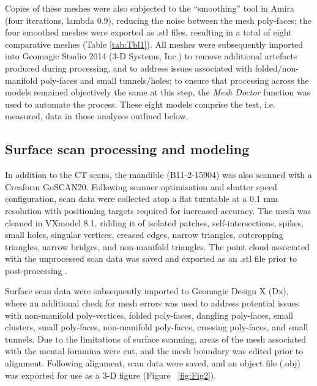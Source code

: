 \documentclass[review]{elsarticle}
\begin{document}
Copies of these meshes were also subjected to the “smoothing” tool in Amira (four iterations, lambda 0.9), reducing the noise between the mesh poly-faces; the four smoothed meshes were exported as .stl files, resulting in a total of eight comparative meshes (Table \ref{tab:Tbl1}). All meshes were subsequently imported into Geomagic Studio 2014 (3-D Systems, Inc.) to remove additional artefacts produced during processing, and to address issues associated with folded/non-manifold poly-faces and small tunnels/holes; to ensure that processing across the models remained objectively the same at this step, the \textit{Mesh Doctor} function was used to automate the process. These eight models comprise the test, i.e. measured, data in those analyses outlined below. 

\subsection{Surface scan processing and modeling}

In addition to the CT scans, the mandible (B11-2-15904) was also scanned with a Creaform GoSCAN20. Following scanner optimisation and shutter speed configuration, scan data were collected atop a flat turntable at a 0.1 mm resolution with positioning targets required for increased accuracy. The mesh was cleaned in VXmodel 8.1, ridding it of isolated patches, self-intersections, spikes, small holes, singular vertices, creased edges, narrow triangles, outcropping triangles, narrow bridges, and non-manifold triangles. The point cloud associated with the unprocessed scan data was saved and exported as an .stl file prior to post-processing \citep{RN5585}. 

Surface scan data \citep{RN5931,RN5924} were subsequently imported to Geomagic Design X (Dx), where an additional check for mesh errors was used to address potential issues with non-manifold poly-vertices, folded poly-faces, dangling poly-faces, small clusters, small poly-faces, non-manifold poly-faces, crossing poly-faces, and small tunnels. Due to the limitations of surface scanning, areas of the mesh associated with the mental foramina were cut, and the mesh boundary was edited prior to alignment. Following alignment, scan data were saved, and an object file (.obj) was exported for use as a 3-D figure (Figure ~\ref{fig:Fig2}).
\end{document}
